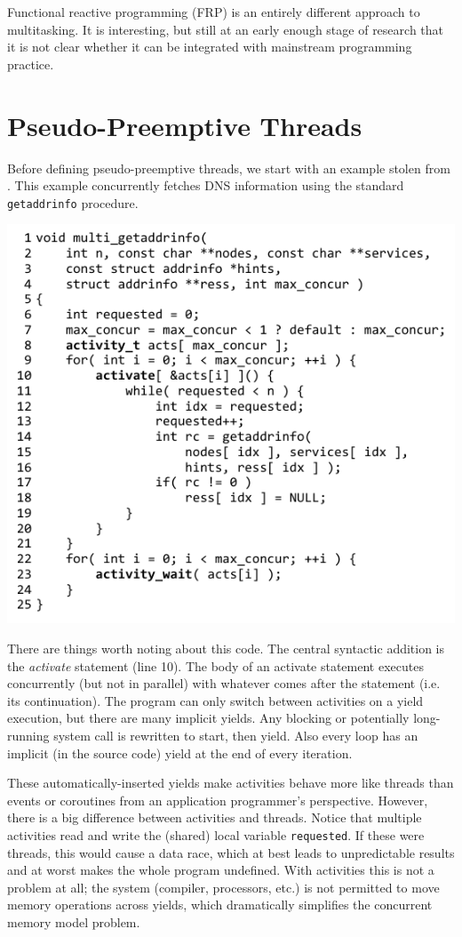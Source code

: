 \documentclass[10pt,preprint]{sigplanconf}
\begin{document}
Functional reactive programming (FRP) is an entirely different approach to multitasking.
It is interesting, but still at an early enough stage of research that it is not clear whether it can be integrated with mainstream programming practice.

\section{Pseudo-Preemptive Threads}

Before defining pseudo-preemptive threads, we start with an example stolen from \cite{Krohn2007}.
This example concurrently fetches DNS information using the standard \texttt{getaddrinfo} procedure.

\hspace{-0.5cm}
\includegraphics{multi_getaddrinfo}

There are things worth noting about this code.
The central syntactic addition is the \emph{activate} statement (line 10).
The body of an activate statement executes concurrently (but not in parallel) with whatever comes after the statement (i.e. its continuation).
The program can only switch between activities on a yield execution, but there are many implicit yields.
Any blocking or potentially long-running system call is rewritten to start, then yield.
Also every loop has an implicit (in the source code) yield at the end of every iteration.

These automatically-inserted yields make activities behave more like threads than events or coroutines from an application programmer's perspective.
However, there is a big difference between activities and threads.
Notice that multiple activities read and write the (shared) local variable \texttt{requested}.
If these were threads, this would cause a data race, which at best leads to unpredictable results and at worst makes the whole program undefined.
With activities this is not a problem at all; the system (compiler, processors, etc.) is not permitted to move memory operations across yields, which dramatically simplifies the concurrent memory model problem.
\end{document}
